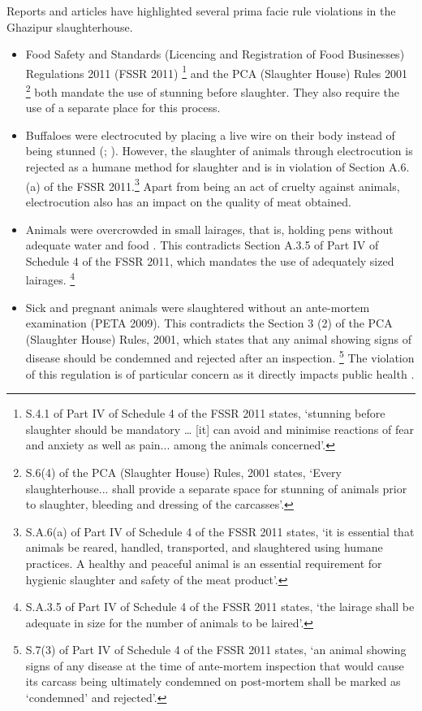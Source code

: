 \documentclass[a4paper, 12pt]{article}
\begin{document}
Reports and articles have highlighted several prima facie rule violations in the Ghazipur slaughterhouse. 

\begin{itemize}
\item Food Safety and Standards (Licencing and Registration of Food Businesses) Regulations 2011 (FSSR 2011) \footnote{S.4.1 of Part IV of Schedule 4 of the FSSR 2011 states, ‘stunning before slaughter should be mandatory … [it] can avoid and minimise reactions of fear and anxiety as well as pain... among the animals concerned’.} and the PCA (Slaughter House) Rules 2001 \footnote{ S.6(4) of the PCA (Slaughter House) Rules, 2001 states, ‘Every slaughterhouse... shall provide a separate space for stunning of animals prior to slaughter, bleeding and dressing of the carcasses’.} both mandate the use of stunning before slaughter. They also require the use of a separate place for this process.
\item Buffaloes were electrocuted by placing a live wire on their body instead of being stunned (\cite{indiannews};  \cite{petareport}). However, the slaughter of animals through electrocution is rejected as a humane method for slaughter \parencite{chaudrypaper} and is in violation of Section A.6.(a) of the FSSR 2011.\footnote{ S.A.6(a) of Part IV of Schedule 4 of the FSSR 2011 states, ‘it is essential that animals be reared, handled, transported, and slaughtered using humane practices. A healthy and peaceful animal is an essential requirement for hygienic slaughter and safety of the meat product’.} Apart from being an act of cruelty against animals, electrocution also has an impact on the quality of meat obtained.
\item Animals were overcrowded in small lairages, that is, holding pens without adequate water and food \parencite{maanvinews}. This contradicts  Section A.3.5 of Part IV of Schedule 4 of the FSSR 2011, which mandates the use of adequately sized lairages. \footnote{ S.A.3.5 of Part IV of Schedule 4 of the FSSR 2011 states, ‘the lairage shall be adequate in size for the number of animals to be laired’.}
\item Sick and pregnant animals were slaughtered without an ante-mortem examination (PETA 2009). This contradicts the Section 3 (2) of the PCA (Slaughter House) Rules, 2001, which states that any animal showing signs of disease should be condemned and rejected after an inspection. \footnote{ S.7(3) of Part IV of Schedule 4 of the FSSR 2011 states, ‘an animal showing signs of any disease at the time of ante-mortem inspection that would cause its carcass being ultimately condemned on post-mortem shall be marked as ‘condemned’ and rejected’.} The violation of this regulation is of particular concern as it directly impacts public health \parencite{mahaptranews}.

\end{itemize}
\end{document}
